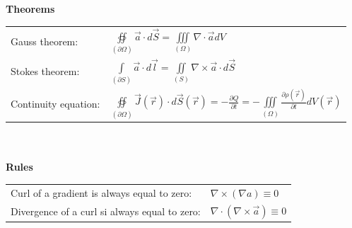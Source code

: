 \textbf{\\ \\ Theorems\\}
\begin{tabular}{ll}
	Gauss theorem: & $\oiint\limits_{\left(\partial \Omega\right)} \vec{a} \cdot d\vec{S} = \iiint\limits_{\left(\Omega\right)} \nabla \cdot \vec{a}dV$\\
	Stokes theorem: & $\int\limits_{\left(\partial S\right)} \vec{a} \cdot d\vec{l} = \iint\limits_{\left(S\right)} \nabla \times \vec{a} \cdot d\vec{S}$\\
	Continuity equation: & $\oiint\limits_{\left(\partial \Omega\right)} \vec{J}\left(\vec{r}\right)\cdot d\vec{S}\left(\vec{r}\right) = -\frac{\partial Q}{\partial t} = -\iiint\limits_{\left(\Omega\right)} \frac{\partial \rho\left(\vec{r}\right)}{\partial t}dV\left(\vec{r}\right)$\\
\end{tabular}

\textbf{\\ \\ Rules \\}
\begin{tabular}{ll}
	Curl of a gradient is always equal to zero: & $\nabla \times \left(\nabla a\right) \equiv 0$ \\
	Divergence of a curl si always equal to zero: & $\nabla \cdot \left(\nabla \times \vec{a}\right) \equiv 0$\\
\end{tabular}